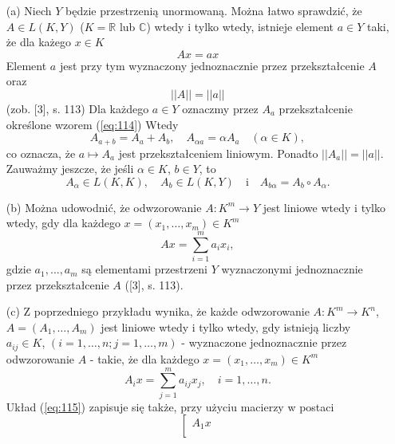 \documentclass[leqno]{article}
\begin{document}
\begin{justify}
\begin{ex}
    \begin{itemize}
        \item [(a)] 
            Niech $Y$ będzie przestrzenią unormowaną. Można łatwo sprawdzić, że $A \in L(K, Y)$ ($K = \mathbb{R}$ lub $\mathbb{C}$) wtedy i tylko wtedy,
            istnieje element $a \in Y$ taki, że dla każego $x \in K$ 
            \begin{equation}\label{eq:114}
                Ax = a x
            \end{equation}
            Element $a$ jest przy tym wyznaczony jednoznacznie przez przekształcenie $A$ oraz 
            \[
                ||A|| = ||a||
            \]
            (zob. [3], s. 113) Dla każdego $a \in Y$ oznaczmy przez $A_a$ przekształcenie określone wzorem (\ref{eq:114}) Wtedy 
            \[
                A_{a+b} = A_a + A_b, \quad A_{\alpha a} = \alpha A_a \quad (\alpha \in K),
            \]
            co oznacza, że $a \mapsto A_a$ jest przekształceniem liniowym. Ponadto $||A_a|| = ||a||$.
            Zauważmy jeszcze, że jeśli $\alpha \in K$, $b \in Y$, to 
            \[
                A_{\alpha} \in L(K, K), \quad A_b \in L(K, Y) \quad \text{i} \quad A_{b \alpha} = A_b \circ A_{\alpha}.
            \]
        \item [(b)]
            Można udowodnić, że odwzorowanie $A : K^m \to Y$ jest liniowe wtedy i tylko wtedy, gdy 
            dla każdego $x = (x_1, \ldots, x_m) \in K^m$
            \[
                Ax = \sum\limits_{i=1}^{m}a_i x_i,
            \]
            gdzie $a_1, \ldots, a_m$ są elementami przestrzeni $Y$ wyznaczonymi jednoznacznie przez 
            przekształcenie $A$ ([3], s. 113).
        \item [(c)]
            Z poprzedniego przykładu wynika, że każde odwzorowanie $A : K^m \to K^n$, $A = (A_1, 
            \ldots, A_m)$ jest liniowe wtedy i tylko wtedy, gdy istnieją liczby $a_{ij} \in K$, $(i = 1, \ldots, n; j= 1,
            \ldots,m)$ - wyznaczone jednoznacznie przez odwzorowanie $A$ - takie, że dla każdego $x = (x_1, \ldots, x_m) \in K^m$
            \begin{equation}\label{eq:115}
                A_i x = \sum_{j=1}^{m}a_{ij}x_j, \quad i = 1, \ldots, n.
            \end{equation}
            Układ (\ref{eq:115}) zapisuje się także, przy użyciu macierzy w postaci 
            \[
                \left[
                \begin{array}{c}
                A_1 x \\

\end{array}\]
\end{itemize}
\end{ex}
\end{justify}
\end{document}
